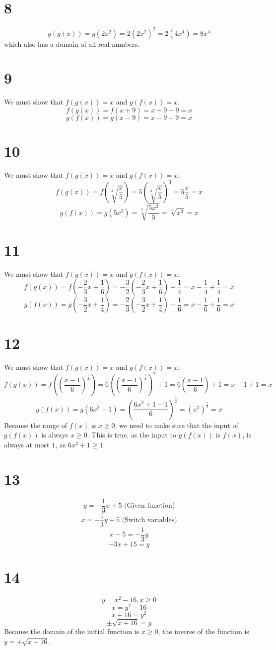 \documentclass{article}
\theoremstyle{definition}
\begin{document}
\section*{8}
\[ g(g(x))=g(2x^2)=2(2x^2)^2=2(4x^4)=8x^4 \]
which also has a domain of all real numbers.

\section*{9}
We must show that $f(g(x))=x$ and $g(f(x))=x$.
\[ f(g(x))=f(x+9)=x+9-9=x \]
\[ g(f(x))=g(x-9)=x-9+9=x \]

\section*{10}
We must show that $f(g(x))=x$ and $g(f(x))=x$.
\[ f(g(x))=f(\sqrt[3]{\frac{x}{5}})=5(\sqrt[3]{\frac{x}{5}})^3=5\frac{x}{5}=x \]
\[ g(f(x))=g(5x^3)=\sqrt[3]{\frac{5x^3}{5}}=\sqrt[3]{x^3}=x \]

\section*{11}
We must show that $f(g(x))=x$ and $g(f(x))=x$.
\[ f(g(x))=f(-\frac{2}{3}x+\frac{1}{6})=-\frac{3}{2}(-\frac{2}{3}x+\frac{1}{6})+\frac{1}{4}=x-\frac{1}{4}+\frac{1}{4}=x \]
\[ g(f(x))=g(-\frac{3}{2}x+\frac{1}{4})=-\frac{2}{3}(-\frac{3}{2}x+\frac{1}{4})+\frac{1}{6}=x-\frac{1}{6}+\frac{1}{6}=x \]

\section*{12}
We must show that $f(g(x))=x$ and $g(f(x))=x$. 
\[ f(g(x))=f((\frac{x-1}{6})^\frac{1}{2})=6((\frac{x-1}{6})^\frac{1}{2})^2+1=6(\frac{x-1}{6})+1=x-1+1=x \]
\[ g(f(x))=g(6x^2+1)=(\frac{6x^2+1-1}{6})^\frac{1}{2}=(x^2)^\frac{1}{2}=x \]
Because the range of $f(x)$ is $x\ge 0$, we need to make sure that the input of $g(f(x))$ is always $x\ge 0$. This is true, as the input to 
$g(f(x))$ is $f(x)$, is always at most $1$, as $6x^2+1\ge 1$.

\section*{13}
\[ y=-\frac{1}{3}x+5 \textrm{ (Given function)} \]
\[ x=-\frac{1}{3}y+5 \textrm{ (Switch variables)} \]
\[ x-5=-\frac{1}{3}y \]
\[ -3x+15=y \]

\section*{14}
\[ y=x^2-16,x\ge 0 \]
\[ x=y^2-16 \]
\[ x+16=y^2 \]
\[ \pm\sqrt{x+16}=y \]
Because the domain of the initial function is $x\ge 0$, the inverse of the function is $y=+\sqrt{x+16}$.
\end{document}
